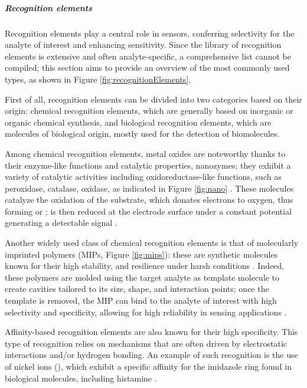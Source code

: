 \subparagraph{Recognition elements}
Recognition elements play a central role in sensors, conferring selectivity for
the analyte of interest and enhancing sensitivity. Since the library of
recognition elements is extensive and often analyte-specific, a comprehensive
list cannot be compiled; this section aims to provide an overview of the most
commonly used types, as shown in Figure \ref{fig:recognitionElements}.

First of all, recognition elements can be divided into two categories based on
their origin: chemical recognition elements, which are generally based on
inorganic or organic chemical synthesis, and biological recognition elements,
which are molecules of biological origin, mostly used for the detection of
biomolecules.

Among chemical recognition elements, metal oxides are noteworthy thanks to their
enzyme-like functions and catalytic properties, \ie{} nanozymes; they exhibit a
variety of catalytic activities including oxidoreductase-like functions, such as
peroxidase, catalase, oxidase, as indicated in Figure \ref{fig:nano}
\citep{poolakkandyTransition2021,huangNanozymes2019}. These molecules catalyze
the oxidation of the substrate, which donates electrons to oxygen, thus forming
 or ;  is then reduced at the electrode surface under
a constant potential generating a detectable signal \citep{liuReview2021}.

Another widely used class of chemical recognition elements is that of
molecularly imprinted polymers (MIPs, Figure \ref{fig:mips}): these are
synthetic molecules known for their high stability, and resilience under harsh
conditions \citep{uzunMolecularlyimprinted2016}. Indeed, these polymers are
molded using the target analyte as template molecule to create cavities tailored
to its size, shape, and interaction points; once the template is removed, the
MIP can bind to the analyte of interest with high selectivity and specificity,
allowing for high reliability in sensing applications
\citep{hassanBiomimetic2019}.

Affinity-based recognition elements are also known for their high specificity.
This type of recognition relies on mechanisms that are often driven by
electrostatic interactions and/or hydrogen bonding. An example of such
recognition is the use of nickel ions (), which exhibit a specific
affinity for the imidazole ring found in biological molecules, including
histamine \citep{fukushimaColorimetric2021}.

